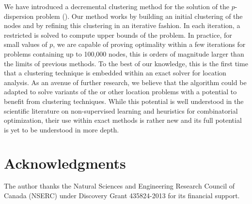 \documentclass[ijoo,nonblindrev]{informs-ijoo}
\begin{document}
We have introduced a decremental clustering method for the solution of the $p$-dispersion problem (\pDP{}). Our method works by building an initial clustering of the nodes and by refining this clustering in an iterative fashion. In each iteration, a restricted \pDP{} is solved to compute upper bounds of the problem. In practice, for small values of $p$, we are capable of proving optimality within a few iterations for problems containing up to 100,000 nodes, this is orders of magnitude larger than the limits of previous methods. To the best of our knowledge, this is the first time that a clustering technique is embedded within an exact solver for location analysis. As an avenue of further research, we believe that the algorithm could be adapted to solve variants of the \pDP{} or other location problems with a potential to benefit from clustering techniques. While this potential is well understood in the scientific literature on non-supervised learning and heuristics for combinatorial optimization, their use within exact methods is rather new and its full potential is yet to be understood in more depth.

\section*{Acknowledgments}

The author thanks the Natural Sciences and Engineering Research Council of Canada (NSERC) under Discovery Grant 435824-2013 for its financial support.



\end{document}
